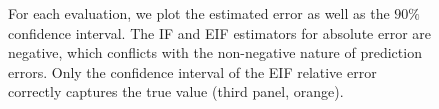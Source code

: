 \documentclass[twoside]{article}
\newcommand{\1}{{\mathbbm{1}}}
\begin{document}
\begin{figure}[ht]
{        %
        For each evaluation, we plot the estimated error as well as the $90\%$ confidence interval.
        The IF and EIF estimators for absolute error are negative, which conflicts with the non-negative nature of prediction errors. 
        Only the confidence interval of the EIF relative error correctly captures the true value (third panel, orange).
        }
    \label{fig:inaccurate nuisance function estimator}
\end{figure}


\end{document}
